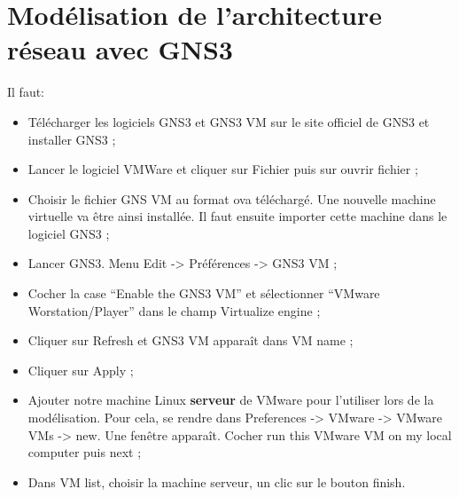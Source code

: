 \documentclass[a4paper,12pt,french]{report} %
\begin{document}
\section{Modélisation de l'architecture réseau avec GNS3}
Il faut: 
\begin{itemize}
	\item Télécharger les logiciels GNS3  et GNS3 VM sur le site officiel de GNS3 et installer GNS3 ;
	\item Lancer le logiciel VMWare et cliquer sur Fichier puis sur  ouvrir fichier ;
	\item Choisir le fichier GNS VM au format ova téléchargé. Une nouvelle machine virtuelle va être ainsi installée. Il faut ensuite importer cette machine dans le logiciel GNS3 ;
	\item Lancer  GNS3. Menu Edit -> Préférences -> GNS3 VM ;
	\item Cocher la case  “Enable the GNS3 VM” et sélectionner “VMware Worstation/Player” dans le champ Virtualize engine ;
	\item Cliquer sur Refresh et GNS3 VM apparaît dans VM name ;
	\item Cliquer sur Apply ;
	\item Ajouter notre machine Linux \textbf{serveur} de VMware pour l'utiliser lors de la modélisation. Pour cela, se rendre dans Preferences -> VMware -> VMware VMs -> new. Une fenêtre apparaît. Cocher run this VMware VM on my local computer puis next ;
	\item Dans VM list, choisir la machine serveur, un clic sur le bouton finish.
\end{itemize}
\end{document}
